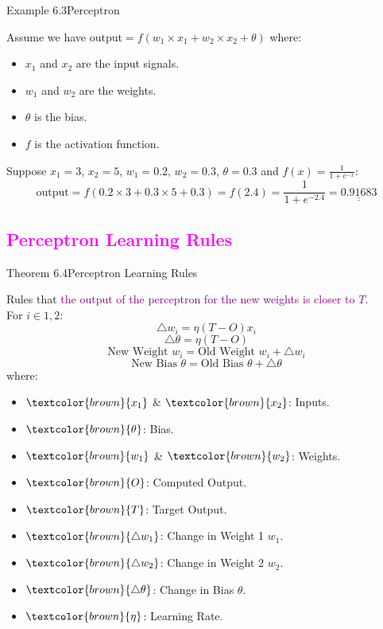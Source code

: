 \documentclass{book}
\begin{document}
\begin{egBox}{Example 6.3}{Perceptron}
    \raggedright
    Assume we have \(\text{output} = f(w_1 \times x_1 + w_2 \times x_2 + \theta)\) where:\\
    \begin{itemize}
        \item \(x_1\) and \(x_2\) are the input signals.
        \item \(w_1\) and \(w_2\) are the weights.
        \item \(\theta\) is the bias.
        \item \(f\) is the activation function.
    \end{itemize}
    \vspace{3mm}
    Suppose \(x_1 = 3\), \(x_2 = 5\), \(w_1 = 0.2\), \(w_2 = 0.3\), \(\theta = 0.3\) and \(f(x) = \frac{1}{1+e^{-x}}\):
    \[
        \text{output} = f(0.2 \times 3 + 0.3 \times 5 + 0.3) = f(2.4) = \frac{1}{1+e^{-2.4}} = \underline{\underline{0.91683}}
    \]
\end{egBox}
\textcolor{magenta}{\section{\textbf{Perceptron Learning Rules}}}
\begin{thmBox}{Theorem 6.4}{Perceptron Learning Rules}
    \raggedright
    Rules that \textcolor{purple}{the output of the perceptron for the new weights is closer to \(T\)}.\\
    For \(i \in {1, 2}\):
    \[
        \triangle w_i = \eta(T - O)x_i
    \]
    \[
        \triangle \theta = \eta(T - O)
    \]
    \[
        \text{New Weight } w_i = \text{Old Weight } w_i + \triangle w_i
    \]
    \[
        \text{New Bias } \theta = \text{Old Bias } \theta + \triangle \theta
    \]
    where:\\
    \begin{itemize}
        \item \(\textcolor{brown}{x_1}\) \& \(\textcolor{brown}{x_2}\): Inputs.
        \item \(\textcolor{brown}{\theta}\): Bias.
        \item \(\textcolor{brown}{w_1}\) \& \(\textcolor{brown}{w_2}\): Weights.
        \item \(\textcolor{brown}{O}\): Computed Output.
        \item \(\textcolor{brown}{T}\): Target Output.
        \item \(\textcolor{brown}{\triangle w_1}\): Change in Weight 1 \(w_1\).
        \item \(\textcolor{brown}{\triangle w_2}\): Change in Weight 2 \(w_2\).
        \item \(\textcolor{brown}{\triangle \theta}\): Change in Bias \(\theta\).
        \item \(\textcolor{brown}{\eta}\): Learning Rate.
    \end{itemize}
\end{thmBox}
\end{document}
